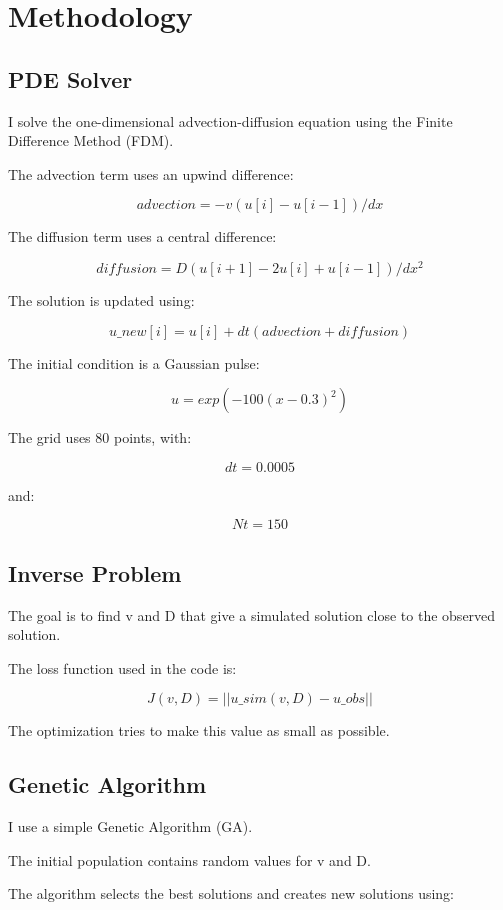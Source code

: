 \section{Methodology}

\subsection{PDE Solver}

I solve the one-dimensional advection-diffusion equation using the Finite Difference Method (FDM).

The advection term uses an upwind difference:

\[
advection = -v (u[i] - u[i-1]) / dx
\]

The diffusion term uses a central difference:

\[
diffusion = D (u[i+1] - 2u[i] + u[i-1]) / dx^2
\]

The solution is updated using:

\[
u\_new[i] = u[i] + dt (advection + diffusion)
\]

The initial condition is a Gaussian pulse:

\[
u = exp(-100 (x-0.3)^2)
\]

The grid uses 80 points, with:

\[
dt = 0.0005
\]

and:

\[
Nt = 150
\]

\subsection{Inverse Problem}

The goal is to find v and D that give a simulated solution close to the observed solution.

The loss function used in the code is:

\[
J(v,D) = ||u\_sim(v,D) - u\_obs||
\]

The optimization tries to make this value as small as possible.

\subsection{Genetic Algorithm}

I use a simple Genetic Algorithm (GA).

The initial population contains random values for v and D.

The algorithm selects the best solutions and creates new solutions using:

